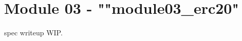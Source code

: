 \newpage
\section{Module 03 - {\ttfamily ""module03\_erc20"}}
\label{sec:module03_predicate}

spec writeup WIP.

